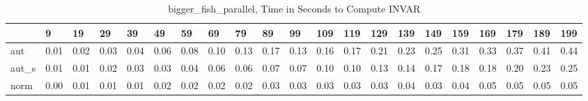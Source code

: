 \begin{table}
\caption{bigger_fish_parallel, Time in Seconds to Compute INVAR}
\label{bigger_fish_parallel_INVAR_time}
\begin{tabular}{lllllllllllllllllllll}
\toprule
 & 9 & 19 & 29 & 39 & 49 & 59 & 69 & 79 & 89 & 99 & 109 & 119 & 129 & 139 & 149 & 159 & 169 & 179 & 189 & 199 \\
\midrule
aut & 0.01 & 0.02 & 0.03 & 0.04 & 0.06 & 0.08 & 0.10 & 0.13 & 0.17 & 0.13 & 0.16 & 0.17 & 0.21 & 0.23 & 0.25 & 0.31 & 0.33 & 0.37 & 0.41 & 0.44 \\
aut_s & 0.01 & 0.01 & 0.02 & 0.03 & 0.03 & 0.04 & 0.06 & 0.06 & 0.07 & 0.07 & 0.10 & 0.10 & 0.13 & 0.14 & 0.17 & 0.18 & 0.18 & 0.20 & 0.23 & 0.25 \\
norm & 0.00 & 0.01 & 0.01 & 0.01 & 0.02 & 0.02 & 0.02 & 0.02 & 0.03 & 0.03 & 0.03 & 0.03 & 0.03 & 0.04 & 0.03 & 0.04 & 0.05 & 0.05 & 0.05 & 0.05 \\
\bottomrule
\end{tabular}
\end{table}
